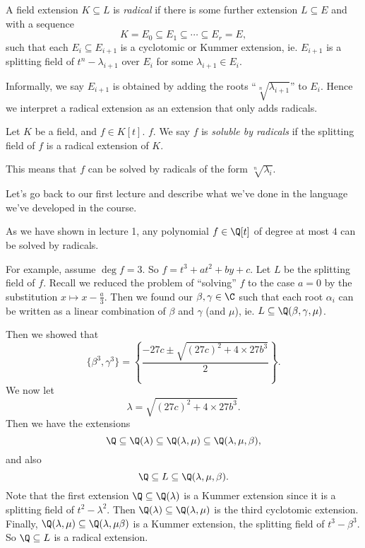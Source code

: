 \documentclass[a4paper]{article}
\begin{document}
\begin{defi}
  A field extension $K\subseteq L$ is \emph{radical} if there is some further extension $L\subseteq E$ and with a sequence
  \[
    K = E_0 \subseteq E_1 \subseteq \cdots \subseteq E_r = E,
  \]
  such that each $E_i \subseteq E_{i + 1}$ is a cyclotomic or Kummer extension, ie. $E_{i + 1}$ is a splitting field of $t^n - \lambda_{i + 1}$ over $E_i$ for some $\lambda_{i + 1} \in E_i$.
\end{defi}
Informally, we say $E_{i + 1}$ is obtained by adding the roots ``$\sqrt[n]{\lambda_{i + 1}}$'' to $E_i$. Hence we interpret a radical extension as an extension that only adds radicals.

\begin{defi}
  Let $K$ be a field, and $f \in K[t]$. $f$. We say $f$ is \emph{soluble by radicals} if the splitting field of $f$ is a radical extension of $K$.
\end{defi}
This means that $f$ can be solved by radicals of the form $\sqrt[n]{\lambda_i}$.

Let's go back to our first lecture and describe what we've done in the language we've developed in the course.
\begin{eg}
  As we have shown in lecture 1, any polynomial $f \in \Q[t]$ of degree at most $4$ can be solved by radicals.

  For example, assume $\deg f = 3$. So $f = t^3 + a t^2 + by + c$. Let $L$ be the splitting field of $f$. Recall we reduced the problem of ``solving'' $f$ to the case $a = 0$ by the substitution $x \mapsto x - \frac{a}{3}$. Then we found our $\beta, \gamma \in \C$ such that each root $\alpha_i$ can be written as a linear combination of $\beta$ and $\gamma$ (and $\mu$), ie. $L \subseteq \Q(\beta, \gamma, \mu)$.

  Then we showed that
  \[
    \{\beta^3, \gamma^3\} = \left\{\frac{-27 c \pm \sqrt{(27c)^2 + 4\times 27b^3}}{2}\right\}.
  \]
  We now let
  \[
    \lambda = \sqrt{(27 c)^2 + 4\times 27 b^3}.
  \]
  Then we have the extensions
  \[
    \Q \subseteq \Q(\lambda) \subseteq \Q(\lambda, \mu) \subseteq \Q(\lambda, \mu, \beta),
  \]
  and also
  \[
    \Q \subseteq L \subseteq \Q(\lambda, \mu, \beta).
  \]
  Note that the first extension $\Q \subseteq \Q(\lambda)$ is a Kummer extension since it is a splitting field of $t^2 - \lambda^2$. Then $\Q(\lambda)\subseteq \Q(\lambda, \mu)$ is the third cyclotomic extension. Finally, $\Q(\lambda, \mu) \subseteq \Q(\lambda, \mu \beta)$ is a Kummer extension, the splitting field of $t^3 - \beta^3$. So $\Q \subseteq L$ is a radical extension.
\end{eg}
\end{document}
